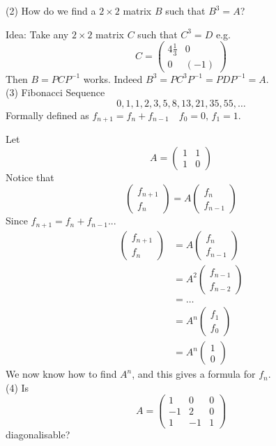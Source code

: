 \documentclass[10pt]{scrartcl}
\begin{document}
\begin{examples}
(2) How do we find a $2 \times 2$ matrix $B$ such that $B^3 = A$?

Idea: Take any $2 \times 2$ matrix $C$ such that $C^3 = D$ e.g. 
\[
  C = \begin{pmatrix}
 4\frac{1}{3} & 0 \\ 0 & (-1)	
 \end{pmatrix}
\]
Then $B = PCP^{-1}$ works. Indeed $B^3 = PC^3P^{-1} = PDP^{-1} = A$.\\

(3) Fibonacci Sequence
\[
  0,1,1,2,3,5,8,13,21,35,55,\dots
\]
Formally defined as $f_{n+1} = f_n + f_{n-1} \quad f_0 = 0,\, f_1 = 1$. 

Let 
\[
  A = \begin{pmatrix}
 1 & 1 \\ 1 & 0	
 \end{pmatrix}
\]
Notice that 
\[
  \begin{pmatrix}
  f_{n+1}\\ f_n	
  \end{pmatrix}
  = A\begin{pmatrix}
f_n \\ f_{n-1}	
\end{pmatrix}
\]
Since $f_{n+1} = f_n + f_{n-1}$... 
\begin{align*}
  \begin{pmatrix}
  f_{n+1}\\ f_n 	
  \end{pmatrix} &= 
  A\begin{pmatrix}
	f_n \\ f_{n-1}
\end{pmatrix}\\
&= A^2 \begin{pmatrix}
 f_{n-1} \\ f_{n-2}	
 \end{pmatrix}\\
 &= \dots\\
 &= A^n\begin{pmatrix}
f_1 \\ f_0	
\end{pmatrix}\\
&= A^n \begin{pmatrix}
	1 \\ 0
\end{pmatrix}
\end{align*}
We now know how to find $A^n$, and this gives a formula for $f_n$. \\

(4) Is 
\[
  A = \begin{pmatrix}
  1& 0 & 0\\ -1 & 2 & 0\\ 1 & -1 & 1	
 \end{pmatrix}
\]
diagonalisable? 


\end{examples}
\end{document}
